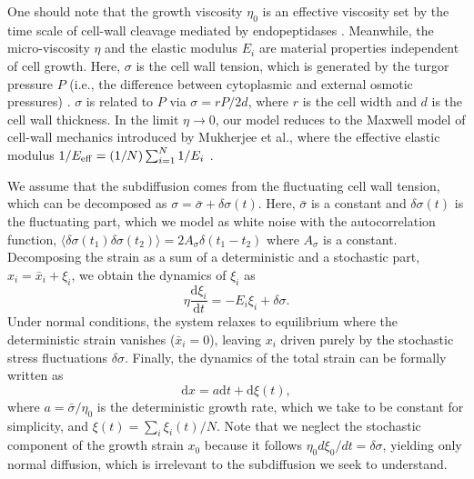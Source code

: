 \documentclass[aps, prl, twocolumn, longbibliography, linenumbers, superscriptaddress]{revtex4-2}
\newcommand{\blue}{\color{blue}}
\begin{document}
One should note that the growth viscosity $\eta_0$ is an effective viscosity set by the time scale of cell-wall cleavage mediated by endopeptidases \cite{Mukherjee2025bacterial}. Meanwhile, the micro-viscosity $\eta$ and the elastic modulus $E_i$ are material properties independent of cell growth. Here, $\sigma$ is the cell wall tension, which is generated by the turgor pressure $P$ (i.e., the difference between cytoplasmic and external osmotic pressures) \cite{Arnoldi2000bacterial, Deng2011direct, Rojas2014response, Zhang2021measurement, Ye2025physical}. $\sigma$ is related to $P$ via $\sigma = rP/2d$, where $r$ is the cell width and $d$ is the cell wall thickness. {\blue In the limit $\eta\rightarrow 0$, our model reduces to the Maxwell model of cell-wall mechanics introduced by Mukherjee et al., where the effective elastic modulus $1/E_{\rm{eff}}= (1/N)\sum_{i=1}^{N}1/E_i$ \cite{Mukherjee2025bacterial}.}


We assume that the subdiffusion comes from the fluctuating cell wall tension, which can be decomposed as $\sigma=\bar{\sigma}+\delta \sigma(t)$. Here, $\bar{\sigma}$ is a constant and $\delta\sigma(t)$ is the fluctuating part, which we model as white noise with the autocorrelation function, $\langle \delta \sigma(t_1)\delta \sigma(t_2)\rangle = 2A_\sigma \delta(t_1-t_2)$ where $A_{\sigma}$ is a constant. Decomposing the strain as a sum of a deterministic and a stochastic part, $x_i=\bar{x}_i +\xi_i$, we obtain the dynamics of $\xi_i$ as
\begin{equation}
	\eta \frac{\mathrm{d} \xi_i}{\mathrm{d}t} = -E_i \xi_i + \delta \sigma.
	\label{eq:constitutive}
\end{equation}
{\blue Under normal conditions, the system relaxes to equilibrium where the deterministic strain vanishes ($\bar{x}_i = 0$), leaving $x_i$ driven purely by the stochastic stress fluctuations $\delta \sigma$.}
	Finally, the dynamics of the total strain can be formally written as
	\begin{equation}
		\mathrm{d}x = a \mathrm{d}t + \mathrm{d} \xi(t), 
		\label{voigt_xt}
	\end{equation}
	{\blue where $a = \bar{\sigma}/\eta_0$ is the deterministic growth rate}, which we take to be constant for simplicity, and $\xi(t) = \sum_i \xi_i(t)/N$.
	Note that we neglect the stochastic component of the growth strain $x_0$ because it follows $\eta_0  d\xi_0/dt=\delta \sigma$, yielding only normal diffusion, which is irrelevant to the subdiffusion we seek to understand.
\end{document}
